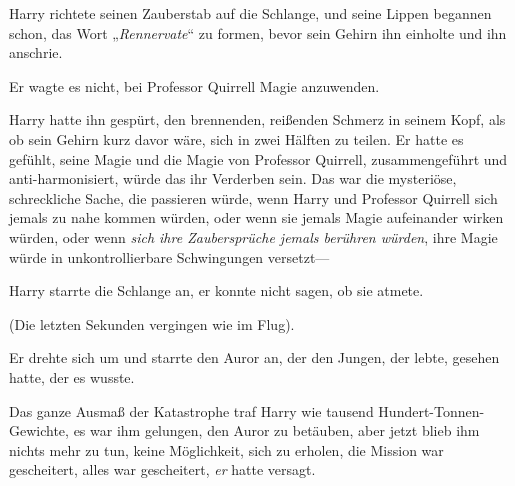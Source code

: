 Harry richtete seinen Zauberstab auf die Schlange, und seine Lippen begannen schon, das Wort „\emph{Rennervate}“ zu formen, bevor sein Gehirn ihn einholte und ihn anschrie.

Er wagte es nicht, bei Professor Quirrell Magie anzuwenden.

Harry hatte ihn gespürt, den brennenden, reißenden Schmerz in seinem Kopf, als ob sein Gehirn kurz davor wäre, sich in zwei Hälften zu teilen. Er hatte es gefühlt, seine Magie und die Magie von Professor Quirrell, zusammengeführt und anti-harmonisiert, würde das ihr Verderben sein. Das war die mysteriöse, schreckliche Sache, die passieren würde, wenn Harry und Professor Quirrell sich jemals zu nahe kommen würden, oder wenn sie jemals Magie aufeinander wirken würden, oder wenn \emph{sich ihre Zaubersprüche jemals berühren würden}, ihre Magie würde in unkontrollierbare Schwingungen versetzt—

Harry starrte die Schlange an, er konnte nicht sagen, ob sie atmete.

(Die letzten Sekunden vergingen wie im Flug).

Er drehte sich um und starrte den Auror an, der den Jungen, der lebte, gesehen hatte, der es wusste.

Das ganze Ausmaß der Katastrophe traf Harry wie tausend Hundert-Tonnen-Gewichte, es war ihm gelungen, den Auror zu betäuben, aber jetzt blieb ihm nichts mehr zu tun, keine Möglichkeit, sich zu erholen, die Mission war gescheitert, alles war gescheitert, \emph{er} hatte versagt.

